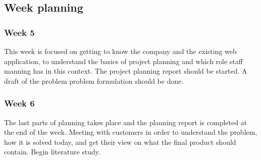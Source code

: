 

\subsection{Week planning}

\subsubsection{Week 5}

This week is focused on getting to know the company and the existing web
application, to understand the basics of project planning and which role
staff manning has in this context. The project planning report should be
started. A draft of the problem problem formulation should be done.


\subsubsection{Week 6}

The last parts of planning takes place and the planning report is
completed at the end of the week. Meeting with customers in order to
understand the problem, how it is solved today, and get their view on
what the final product should contain. Begin literature study.



